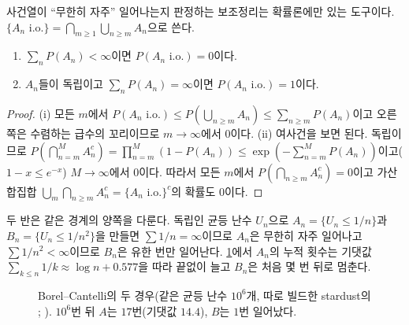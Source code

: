 사건열이 ``무한히 자주'' 일어나는지 판정하는 보조정리는 확률론에만 있는 도구이다. $\{A_n\text{ i.o.}\}=\bigcap_{m\ge1}\bigcup_{n\ge m}A_n$으로 쓴다.

\begin{lemma}
\label{lem:borel-cantelli}
\begin{enumerate}
\item $\sum_nP(A_n)<\infty$이면 $P(A_n\text{ i.o.})=0$이다.
\item $A_n$들이 독립이고 $\sum_nP(A_n)=\infty$이면 $P(A_n\text{ i.o.})=1$이다.
\end{enumerate}
\end{lemma}

\begin{proof}
(i) 모든 $m$에서 $P(A_n\text{ i.o.})\le P(\bigcup_{n\ge m}A_n)\le\sum_{n\ge m}P(A_n)$이고 오른쪽은 수렴하는 급수의 꼬리이므로 $m\to\infty$에서 $0$이다. (ii) 여사건을 보면 된다. 독립이므로 $P(\bigcap_{n=m}^MA_n^c)=\prod_{n=m}^M(1-P(A_n))\le\exp(-\sum_{n=m}^MP(A_n))$이고($1-x\le e^{-x}$) $M\to\infty$에서 $0$이다. 따라서 모든 $m$에서 $P(\bigcap_{n\ge m}A_n^c)=0$이고 가산 합집합 $\bigcup_m\bigcap_{n\ge m}A_n^c=\{A_n\text{ i.o.}\}^c$의 확률도 $0$이다.
\end{proof}

두 반은 같은 경계의 양쪽을 다룬다. 독립인 균등 난수 $U_n$으로 $A_n=\{U_n\le1/n\}$과 $B_n=\{U_n\le1/n^2\}$을 만들면 $\sum1/n=\infty$이므로 $A_n$은 무한히 자주 일어나고 $\sum1/n^2<\infty$이므로 $B_n$은 유한 번만 일어난다. \cref{fig:borel-cantelli}에서 $A_n$의 누적 횟수는 기댓값 $\sum_{k\le n}1/k\approx\log n+0.577$을 따라 끝없이 늘고 $B_n$은 처음 몇 번 뒤로 멈춘다.

\begin{figure}[htbp]
\centering
{}
\caption{Borel--Cantelli의 두 경우(같은 균등 난수 $10^6$개, 따로 빌드한 stardust의 ; ). $10^6$번 뒤 $A$는 $17$번(기댓값 $14.4$), $B$는 $1$번 일어났다.}
\label{fig:borel-cantelli}
\end{figure}

